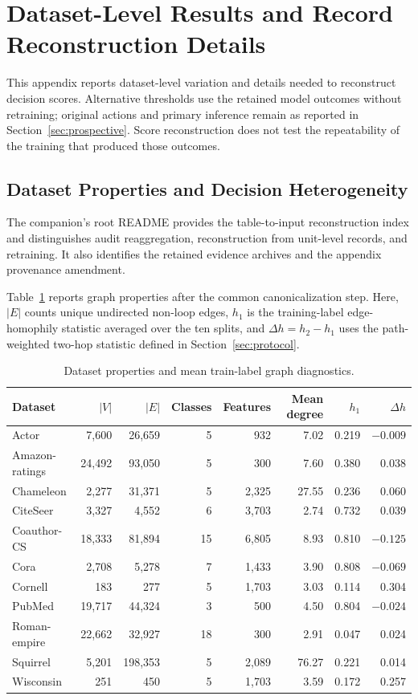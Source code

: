 \section{Dataset-Level Results and Record Reconstruction Details}
\label{app:reproducibility}

This appendix reports dataset-level variation and details needed to reconstruct decision scores. Alternative thresholds use the retained model outcomes without retraining; original actions and primary inference remain as reported in Section~\ref{sec:prospective}. Score reconstruction does not test the repeatability of the training that produced those outcomes.

\subsection{Dataset Properties and Decision Heterogeneity}

The companion's root README provides the table-to-input reconstruction index and distinguishes audit reaggregation, reconstruction from unit-level records, and retraining. It also identifies the retained evidence archives and the appendix provenance amendment.

Table~\ref{tab:dataset_properties} reports graph properties after the common canonicalization step. Here, $|E|$ counts unique undirected non-loop edges, $h_1$ is the training-label edge-homophily statistic averaged over the ten splits, and $\Delta h=h_2-h_1$ uses the path-weighted two-hop statistic defined in Section~\ref{sec:protocol}.

\begin{table}[ht]
\centering
\caption{Dataset properties and mean train-label graph diagnostics.}
\label{tab:dataset_properties}
\scriptsize
\setlength{\tabcolsep}{3.2pt}
\begin{tabular}{@{}lrrrrrrr@{}}
\toprule
Dataset & $|V|$ & $|E|$ & Classes & Features & Mean degree & $h_1$ & $\Delta h$ \\
\midrule
Actor & 7,600 & 26,659 & 5 & 932 & 7.02 & 0.219 & $-0.009$ \\
Amazon-ratings & 24,492 & 93,050 & 5 & 300 & 7.60 & 0.380 & 0.038 \\
Chameleon & 2,277 & 31,371 & 5 & 2,325 & 27.55 & 0.236 & 0.060 \\
CiteSeer & 3,327 & 4,552 & 6 & 3,703 & 2.74 & 0.732 & 0.039 \\
Coauthor-CS & 18,333 & 81,894 & 15 & 6,805 & 8.93 & 0.810 & $-0.125$ \\
Cora & 2,708 & 5,278 & 7 & 1,433 & 3.90 & 0.808 & $-0.069$ \\
Cornell & 183 & 277 & 5 & 1,703 & 3.03 & 0.114 & 0.304 \\
PubMed & 19,717 & 44,324 & 3 & 500 & 4.50 & 0.804 & $-0.024$ \\
Roman-empire & 22,662 & 32,927 & 18 & 300 & 2.91 & 0.047 & 0.024 \\
Squirrel & 5,201 & 198,353 & 5 & 2,089 & 76.27 & 0.221 & 0.014 \\
Wisconsin & 251 & 450 & 5 & 1,703 & 3.59 & 0.172 & 0.257 \\
\bottomrule
\end{tabular}
\end{table}

